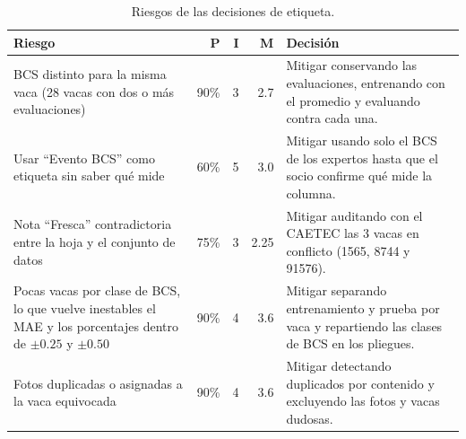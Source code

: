 \begin{table}[H]
  \centering
  \small
  \caption{Riesgos de las decisiones de etiqueta.}
  \label{tab:riesgos}
  \begin{tabularx}{\textwidth}{>{\raggedright\arraybackslash}p{}rrr>{\raggedright\arraybackslash}X}
    \toprule
    Riesgo & P & I & M & Decisión \\
    \midrule
    BCS distinto para la misma vaca (28 vacas con dos o más evaluaciones) & 90\% & 3 & 2.7 & Mitigar conservando las evaluaciones, entrenando con el promedio y evaluando contra cada una. \\
    \addlinespace
    Usar ``Evento BCS'' como etiqueta sin saber qué mide & 60\% & 5 & 3.0 & Mitigar usando solo el BCS de los expertos hasta que el socio confirme qué mide la columna. \\
    \addlinespace
    Nota ``Fresca'' contradictoria entre la hoja y el conjunto de datos & 75\% & 3 & 2.25 & Mitigar auditando con el CAETEC las 3 vacas en conflicto (1565, 8744 y 91576). \\
    \addlinespace
    Pocas vacas por clase de BCS, lo que vuelve inestables el MAE y los porcentajes dentro de $\pm0.25$ y $\pm0.50$ & 90\% & 4 & 3.6 & Mitigar separando entrenamiento y prueba por vaca y repartiendo las clases de BCS en los pliegues. \\
    \addlinespace
    Fotos duplicadas o asignadas a la vaca equivocada & 90\% & 4 & 3.6 & Mitigar detectando duplicados por contenido y excluyendo las fotos y vacas dudosas. \\
    \bottomrule
  \end{tabularx}
\end{table}
